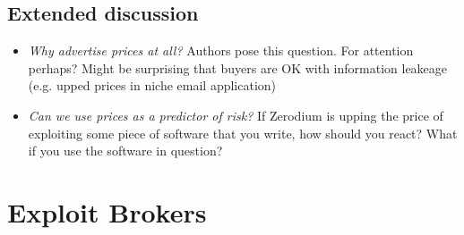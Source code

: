 \documentclass[11pt]{article}
\begin{document}
\subsection{Extended discussion}


\begin{itemize}
    \item {\it Why advertise prices at all?} Authors pose this question. For attention perhaps? Might be surprising that buyers are OK with information leakeage (e.g. upped prices in niche email application)
    \item {\it Can we use prices as a predictor of risk?} If Zerodium is upping the price of exploiting some piece of software that you write, how should you react? What if you use the software in question?
\end{itemize}



\section{Exploit Brokers}

\section{}
\end{document}
